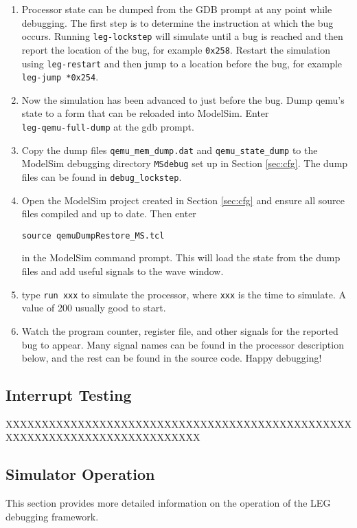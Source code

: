 \begin{enumerate}
\item Processor state can be dumped from the GDB prompt at any point while debugging.
 The first step is to determine the instruction at which the bug occurs.
 Running \texttt{leg-lockstep} will simulate until a bug is reached and then report the location of the bug, for example \texttt{0x258}.
 Restart the simulation using \texttt{leg-restart} and then jump to a location before the bug, for example \texttt{leg-jump *0x254}.
 
\item Now the simulation has been advanced to just before the bug. Dump qemu's state to a form that can be reloaded into ModelSim. Enter \\\texttt{leg-qemu-full-dump} at the gdb prompt.

\item Copy the dump files \texttt{qemu\_mem\_dump.dat} and \texttt{qemu\_state\_dump} to the ModelSim debugging directory \texttt{MSdebug} set up in Section \ref{sec:cfg}.
The dump files can be found in \texttt{debug\_lockstep}.

\item Open the ModelSim project created in Section \ref{sec:cfg} and ensure all source files compiled and up to date.
Then enter 
\begin{verbatim}source qemuDumpRestore_MS.tcl\end{verbatim}
in the ModelSim command prompt.
This will load the state from the dump files and add useful signals to the wave window. 

\item type \texttt{run xxx} to simulate the processor, where \texttt{xxx} is the time to simulate. 
A value of 200 usually good to start.

\item Watch the program counter, register file, and other signals for the reported bug to appear. 
Many signal names can be found in the processor description below, and the rest can be found in the source code.
Happy debugging!
\end{enumerate}

\subsection{Interrupt Testing}
XXXXXXXXXXXXXXXXXXXXXXXXXXXXXXXXXXXXXXXXXXXXXXXXXXXXXXXXXXXXXXXXXXXXXXXXXXX

\subsection{Simulator Operation}
This section provides more detailed information on the operation of the LEG debugging framework.

